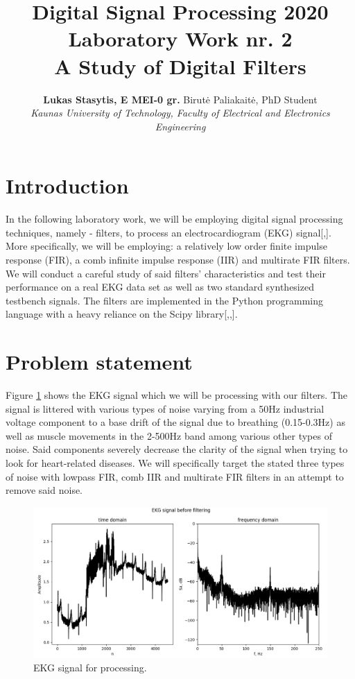 \documentclass[10pt,a4paper,twocolumn]{article}
\title{{\large Digital Signal Processing 2020}\\ \vspace{-12pt} 
{\normalsize{ Laboratory Work nr. 2}}\\
{\Large \textbf{A Study of Digital Filters}}}
\author{\large \textbf{Lukas Stasytis, E MEI-0 gr.} Birutė Paliakaitė, PhD Student \\
{\normalsize \textit{Kaunas University of Technology, Faculty of Electrical and Electronics Engineering}}}
\date{}
\begin{document}
\maketitle

\section*{Introduction}

In the following laboratory work, we will be employing digital signal processing techniques, namely - filters, to process an electrocardiogram (EKG) signal[\cite{b1},\cite{b2}]. More specifically, we will be employing: a relatively low order finite impulse response (FIR), a comb infinite impulse response (IIR) and multirate FIR filters. We will conduct a careful study of said filters' characteristics and test their performance on a real EKG data set as well as two standard synthesized testbench signals. The filters are implemented in the Python programming language with a heavy reliance on the Scipy library[\cite{numpy},\cite{scipy},\cite{pyplot}].


\section*{Problem statement}

Figure \ref{ekg_1} shows the EKG signal which we will be processing with our filters. The signal is littered with various types of noise \cite{noise} varying from a 50Hz industrial voltage component to a base drift of the signal due to breathing (0.15-0.3Hz) as well as muscle movements in the 2-500Hz band among various other types of noise. Said components severely decrease the clarity of the signal when trying to look for heart-related diseases. We will specifically target the stated three types of noise with lowpass FIR, comb IIR and multirate FIR filters in an attempt to remove said noise.

\begin{figure} %
	[!h]
	\centering
	\includegraphics*[width=.8\columnwidth]{ekg_1.png} %
	\caption{EKG signal for processing.}
	\label{ekg_1}
	\vspace{6pt}
\end{figure}
\end{document}
